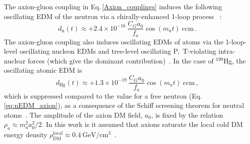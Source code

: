 The axion-gluon coupling in Eq.\,\ref{Axion_couplings} induces the following oscillating EDM of the neutron via a chirally-enhanced 1-loop process~%
\cite{tuningfootnote,Witten1979,Witten1979B,Pospelov1999}:
\begin{equation}
\label{eq:nEDM_axion}
d_\mathrm{n}(t) \approx +2.4 \times 10^{-16} ~ \frac{C_G a_0}{f_a} \cos(m_a t) ~ \si{\elementarycharge\centi\metre} \, .
\end{equation}
The axion-gluon coupling also induces oscillating EDMs of atoms via the 1-loop-level oscillating nucleon EDMs and tree-level oscillating P,~T-violating intra-nuclear forces (which give the dominant contribution)~\cite{Stadnik2014A,Flambaum1984EDM,Flambaum1984EDMB}.
In the case of $^{199}$Hg, the oscillating atomic EDM is~\cite{Stadnik2014A,StadnikThesis,Flambaum1985EDM,Flambaum1985EDMB,Flambaum2002EDM,Dmitriev2003A,Dmitriev2003B,Dmitriev2005,Engel2005,Engel2010}
\begin{equation}
\label{199Hg-EDM_axion}
d_{\textrm{Hg}}(t) \approx +1.3 \times 10^{-19} ~ \frac{C_G a_0}{f_a} \cos(m_a t) ~ \si{\elementarycharge\centi\metre} \, ,
\end{equation}
which is suppressed compared to the value for a free neutron (Eq.\,\ref{eq:nEDM_axion}), as a consequence of the Schiff screening theorem for neutral atoms~\cite{Schiff1963}.
The amplitude of the axion DM field, $a_0$, is fixed by the relation $\rho_a \approx m_a^2 a_0^2 /2$.
In this work is it assumed that axions saturate the local cold DM energy density $\rho_{\mathrm{DM}}^{\mathrm{local}} \approx \SI[per-mode=symbol]{0.4}{\giga\electronvolt\per\centi\metre\cubed}$~\cite{Catena2010}.




